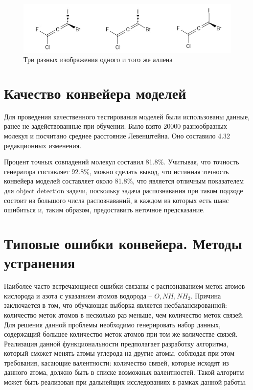 \begin{figure}[ht!] 
	\center
	\includegraphics [scale=1.0] {my_folder/images/allene}
	\caption{Три разных изображения одного и того же аллена}
	\label{fig:allenes}
\end{figure}
	
\section{Качество конвейера моделей} \label{ch3:sec2}
Для проведения качественного тестирования моделей были использованы данные, ранее не задействованные при обучении. Было взято 20000 разнообразных молекул и посчитано среднее расстояние Левенштейна. Оно составило 4.32 редакционных изменения.

Процент точных совпадений молекул составил 81.8\%. Учитывая, что точность генератора составляет 92.8\%, можно сделать вывод, что истинная точность конвейера моделей составляет около 81.8\%, что является отличным показателем для object detection задачи, поскольку задача распознавания при таком подходе состоит из большого числа распознаваний, в каждом из которых есть шанс ошибиться и, таким образом, предоставить неточное предсказание.

\section{Типовые ошибки конвейера. Методы устранения} \label{ch3:sec3}

Наиболее часто встречающиеся ошибки связаны с распознаванием меток атомов кислорода и азота с указанием атомов водорода -- $O, NH, NH_2$. Причина заключается в том, что обучающая выборка является несбалансированной: количество меток атомов в несколько раз меньше, чем количество меток связей. Для решения данной проблемы необходимо генерировать набор данных, содержащий большее количество меток атомов при том же количестве связей. Реализация данной функциональности предполагает разработку алгоритма, который сможет менять атомы углерода на другие атомы, соблюдая при этом требования, касающие валентности: количество связей, которые исходят из данного атома, должно быть в списке возможных валентностей. Такой алгоритм может быть реализован при дальнейщих исследованиях в рамках данной работы.

